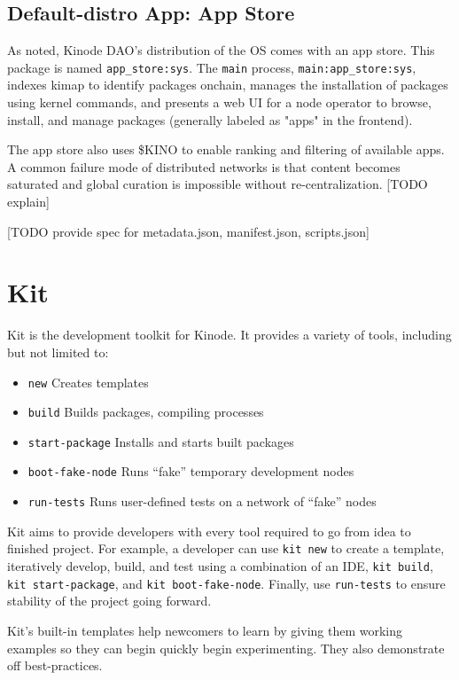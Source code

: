 \documentclass[runningheads]{llncs}
\begin{document}
\subsection{Default-distro App: App Store}

As noted, Kinode DAO's distribution of the OS comes with an app store.
This package is named \verb|app_store:sys|.
The \verb|main| process, \verb|main:app_store:sys|, indexes kimap to identify packages onchain, manages the installation of packages using kernel commands, and presents a web UI for a node operator to browse, install, and manage packages (generally labeled as "apps" in the frontend).

The app store also uses \$KINO to enable ranking and filtering of available apps.
A common failure mode of distributed networks is that content becomes saturated and global curation is impossible without re-centralization. [TODO explain]


[TODO provide spec for metadata.json, manifest.json, scripts.json]

%
%
%
\section{Kit}

Kit is the development toolkit for Kinode.
It provides a variety of tools, including but not limited to:
\begin{itemize}
\item \verb|new| Creates templates
\item \verb|build| Builds packages, compiling processes
\item \verb|start-package| Installs and starts built packages
\item \verb|boot-fake-node| Runs ``fake'' temporary development nodes
\item \verb|run-tests| Runs user-defined tests on a network of ``fake'' nodes
\end{itemize}

Kit aims to provide developers with every tool required to go from idea to finished project.
For example, a developer can use \verb|kit new| to create a template, iteratively develop, build, and test using a combination of an IDE, \verb|kit build|, \verb|kit start-package|, and \verb|kit boot-fake-node|.
Finally, use \verb|run-tests| to ensure stability of the project going forward.

Kit's built-in templates help newcomers to learn by giving them working examples so they can begin quickly begin experimenting.
They also demonstrate off best-practices.
\end{document}

